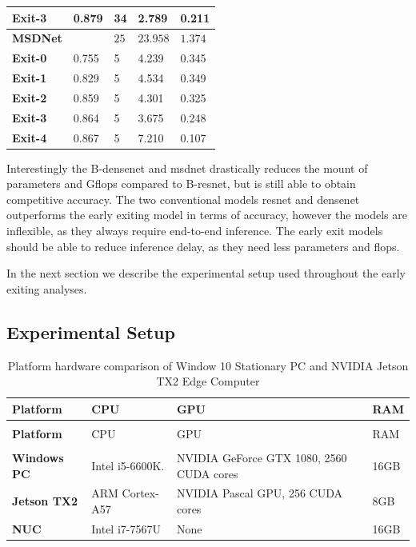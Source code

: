\begin{longtabu}{>{\bfseries}X|X[r]|X[r]|X[r]|X[r]}
	\hspace{3mm} Exit-3 & 0.879 & 34 & 2.789 & 0.211  \tabularnewline
	\hline
	MSDNet & & $ 25 $ & $ 23.958 $ & $ 1.374 $ \tabularnewline
	\hspace{3mm} Exit-0 & 0.755 & 5 & 4.239 & 0.345 \tabularnewline
	\hspace{3mm} Exit-1 & 0.829 & 5 & 4.534 & 0.349 \tabularnewline
	\hspace{3mm} Exit-2 & 0.859 & 5 & 4.301 & 0.325 \tabularnewline
	\hspace{3mm} Exit-3 & 0.864 & 5 & 3.675 & 0.248 \tabularnewline
	\hspace{3mm} Exit-4 & 0.867 & 5 & 7.210 & 0.107 \tabularnewline
	\bottomrule
\end{longtabu}


Interestingly the B-\gls{densenet} and \gls{msdnet} drastically reduces the mount of parameters and G\gls{flop}s compared to B-\gls{resnet}, but is still able to obtain competitive accuracy. The two conventional models \gls{resnet} and \gls{densenet} outperforms the early exiting model in terms of accuracy, however the models are inflexible, as they always require end-to-end inference. The early exit models should be able to reduce inference delay, as they need less parameters and \gls{flop}s.

In the next section we describe the experimental setup used throughout the early exiting analyses.

\subsection{Experimental Setup}

\begin{longtabu}{>{\bfseries}X[0.8]|X[0.8]|X[1.5]|X[r0.3]}
	\caption[Platform hardware comparison]{Platform hardware comparison of Window 10 Stationary PC and NVIDIA Jetson TX2 Edge Computer} \label{tbl:platforms} \\
	\toprule
	\rowfont{\bfseries}
	Platform & CPU & GPU & RAM  \tabularnewline
	\bottomrule
	\endfirsthead
	\\
	\toprule
	\rowfont{\bfseries}
	Platform & CPU & GPU & RAM  \tabularnewline
	\bottomrule
	\endhead %
	\bottomrule
	\\
	\endfoot
	\hline
	\endlastfoot
	Windows PC	& Intel i5-6600K.	& NVIDIA GeForce GTX 1080, 2560 CUDA cores	& 16GB \tabularnewline
	\hline
	Jetson TX2	& ARM Cortex-A57 	& NVIDIA Pascal GPU, 256 CUDA cores 		& 8GB \tabularnewline
	\hline
	NUC		  	& Intel i7-7567U	& None										& 16GB \tabularnewline									
	\bottomrule
\end{longtabu}

